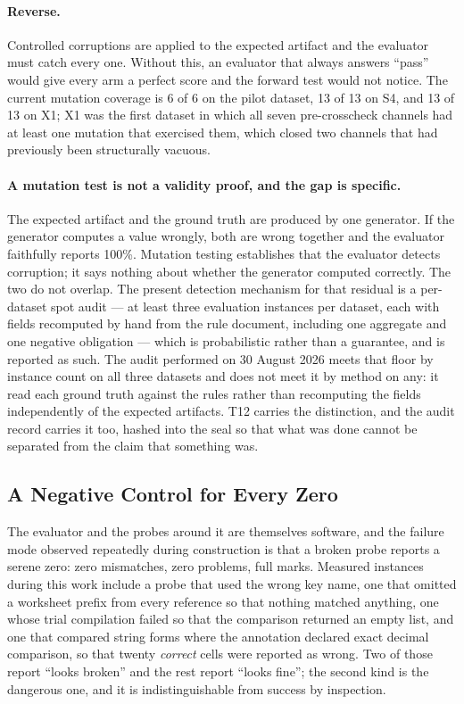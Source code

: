 \paragraph{Reverse.} Controlled corruptions are applied to the expected artifact and the
evaluator must catch every one. Without this, an evaluator that always answers ``pass'' would
give every arm a perfect score and the forward test would not notice. The current mutation
coverage is 6 of 6 on the pilot dataset, 13 of 13 on S4, and 13 of 13 on X1; X1 was the first
dataset in which all seven pre-crosscheck channels had at least one mutation that exercised them,
which closed two channels that had previously been structurally vacuous.

\paragraph{A mutation test is not a validity proof, and the gap is specific.}
The expected artifact and the ground truth are produced by one generator. If the generator
computes a value wrongly, both are wrong together and the evaluator faithfully reports 100\%.
Mutation testing establishes that the evaluator detects corruption; it says nothing about
whether the generator computed correctly. The two do not overlap. The present detection
mechanism for that residual is a per-dataset spot audit --- at least three evaluation
instances per dataset, each with fields recomputed by hand from the rule document, including
one aggregate and one negative obligation --- which is probabilistic rather than a guarantee,
and is reported as such. The audit performed on 30 August 2026 meets that floor by instance
count on all three datasets and does not meet it by method on any: it read each ground truth
against the rules rather than recomputing the fields independently of the expected artifacts.
T12 carries the distinction, and the audit record carries it too, hashed into the seal so
that what was done cannot be separated from the claim that something was.

\subsection{A Negative Control for Every Zero}
\label{sec:eval:negativecontrols}

The evaluator and the probes around it are themselves software, and the failure mode observed
repeatedly during construction is that a broken probe reports a serene zero: zero mismatches,
zero problems, full marks. Measured instances during this work include a probe that used the
wrong key name, one that omitted a worksheet prefix from every reference so that nothing
matched anything, one whose trial compilation failed so that the comparison returned an empty
list, and one that compared string forms where the annotation declared exact decimal
comparison, so that twenty \emph{correct} cells were reported as wrong. Two of those report
``looks broken'' and the rest report ``looks fine''; the second kind is the dangerous one, and
it is indistinguishable from success by inspection.

